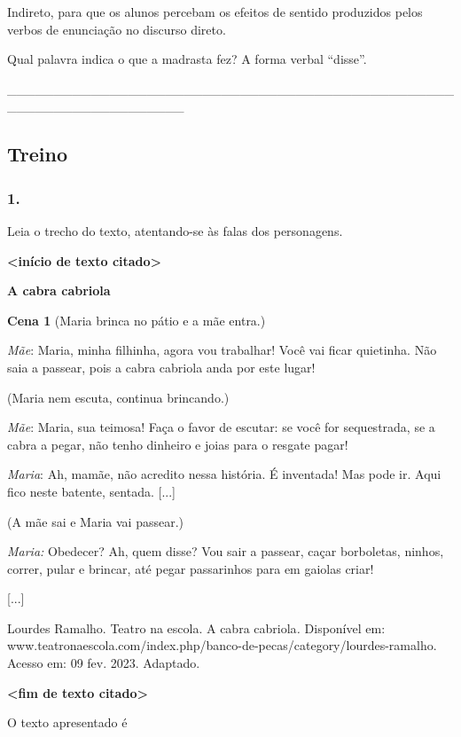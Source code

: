 Indireto, para que os alunos percebam os efeitos de sentido produzidos
pelos verbos de enunciação no discurso direto.

Qual palavra indica o que a madrasta fez? A forma verbal ``disse''.

\_\_\_\_\_\_\_\_\_\_\_\_\_\_\_\_\_\_\_\_\_\_\_\_\_\_\_\_\_\_\_\_\_\_\_\_\_\_\_\_\_\_\_\_\_\_\_\_\_\_\_\_\_\_\_\_\_\_\_\_\_\_\_\_\_\_\_

\subsection{Treino}\label{treino-1}

\subsubsection{1. }\label{section-29}

Leia o trecho do texto, atentando-se às falas dos personagens.

\textbf{\textless{}início de texto citado\textgreater{}}

\textbf{A cabra cabriola }

\textbf{Cena 1} (Maria brinca no pátio e a mãe entra.)

\emph{Mãe}: Maria, minha filhinha, agora vou trabalhar! Você vai ficar
quietinha. Não saia a passear, pois a cabra cabriola anda por este
lugar!

(Maria nem escuta, continua brincando.)

\emph{Mãe}: Maria, sua teimosa! Faça o favor de escutar: se você for
sequestrada, se a cabra a pegar, não tenho dinheiro e joias para o
resgate pagar!

\emph{Maria}: Ah, mamãe, não acredito nessa história. É inventada! Mas
pode ir. Aqui fico neste batente, sentada. {[}...{]}

(A mãe sai e Maria vai passear.)

\emph{Maria:} Obedecer? Ah, quem disse? Vou sair a passear, caçar
borboletas, ninhos, correr, pular e brincar, até pegar passarinhos para
em gaiolas criar!

{[}...{]}

Lourdes Ramalho. Teatro na escola. A cabra cabriola\emph{.} Disponível
em:
www.teatronaescola.com/index.php/banco-de-pecas/category/lourdes-ramalho.
Acesso em: 09 fev. 2023. Adaptado.

\textbf{\textless{}fim de texto citado\textgreater{}}

O texto apresentado é

